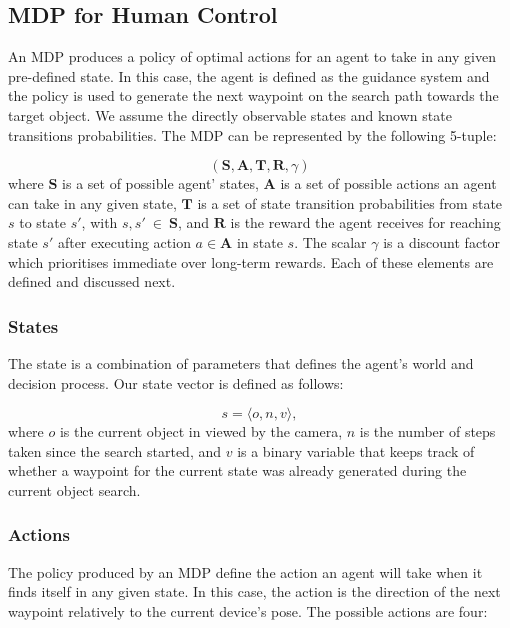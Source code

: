 \documentclass[a4paper, twoside]{article}
\begin{document}
\subsection{MDP for Human Control}

\noindent An MDP produces a policy of optimal actions for an agent to take in any given pre-defined state. In this case, the agent is defined as the guidance system and the policy is used to generate the next waypoint on the search path towards the target object. We assume the directly observable states and known state transitions probabilities. The MDP can be represented by the following 5-tuple:

\begin{equation}
  (\mathbf{S}, \mathbf{A}, \mathbf{T}, \mathbf{R}, \gamma)
\end{equation}
where $\mathbf{S}$ is a set of possible agent' states, $\mathbf{A}$ is a set of possible actions an agent can take in any given state, $\mathbf{T}$ is a set of state transition probabilities from state $s$ to state $s'$, with ${s,s'~\in~\mathbf{S}}$, and $\mathbf{R}$ is the reward the agent receives for reaching state $s'$ after executing action $a \in \mathbf{A}$ in state $s$. The scalar $\gamma$ is a discount factor which prioritises immediate over long-term rewards. Each of these elements are defined and discussed next.

\subsubsection{States}\label{sec:states}

\noindent The state is a combination of parameters that defines the agent's world and decision process. Our state vector is defined as follows: 

\begin{equation}
  s = \langle o, n, v \rangle, 
\end{equation}
where $o$ is the current object in viewed by the camera, $n$ is the number of steps taken since the search started, and $v$ is a binary variable that keeps track of whether a waypoint for the current state was already generated during the current object search. 

\subsubsection{Actions}

The policy produced by an MDP define the action an agent will take when it finds itself in any given state. In this case, the action is the direction of the next waypoint relatively to the current device's pose. The possible actions are four:
\end{document}
